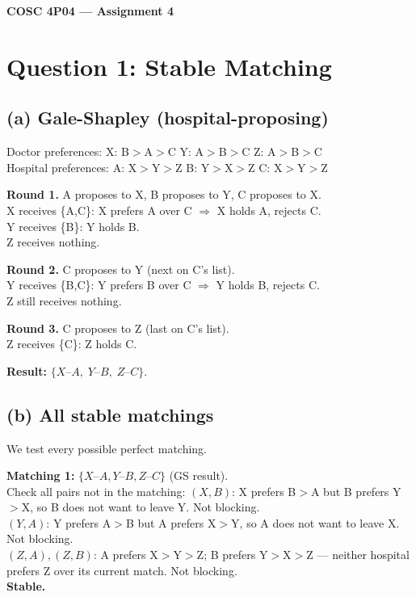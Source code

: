 \documentclass[11pt]{article}
\begin{document}
\begin{center}
  {\large\bfseries COSC 4P04 --- Assignment 4}
\end{center}

\section*{Question 1: Stable Matching}

\subsection*{(a) Gale-Shapley (hospital-proposing)}

Doctor preferences: X: B$>$A$>$C \quad Y: A$>$B$>$C \quad Z: A$>$B$>$C\\
Hospital preferences: A: X$>$Y$>$Z \quad B: Y$>$X$>$Z \quad C: X$>$Y$>$Z

\textbf{Round 1.}
A proposes to X, B proposes to Y, C proposes to X.\\
X receives \{A,C\}: X prefers A over C $\Rightarrow$ X holds A, rejects C.\\
Y receives \{B\}: Y holds B.\\
Z receives nothing.

\textbf{Round 2.}
C proposes to Y (next on C's list).\\
Y receives \{B,C\}: Y prefers B over C $\Rightarrow$ Y holds B, rejects C.\\
Z still receives nothing.

\textbf{Round 3.}
C proposes to Z (last on C's list).\\
Z receives \{C\}: Z holds C.

\textbf{Result:} $\{X\text{--}A,\; Y\text{--}B,\; Z\text{--}C\}$.

\subsection*{(b) All stable matchings}

We test every possible perfect matching.

\textbf{Matching 1:} $\{X\text{--}A, Y\text{--}B, Z\text{--}C\}$ (GS result).\\
Check all pairs not in the matching:
$(X,B)$: X prefers B$>$A but B prefers Y$>$X, so B does not want to leave Y. Not blocking.\\
$(Y,A)$: Y prefers A$>$B but A prefers X$>$Y, so A does not want to leave X. Not blocking.\\
$(Z,A),(Z,B)$: A prefers X$>$Y$>$Z; B prefers Y$>$X$>$Z --- neither hospital prefers Z over its current match. Not blocking.\\
\textbf{Stable.}
\end{document}
